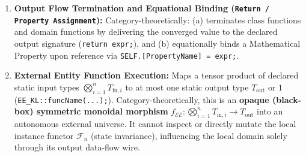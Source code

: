 \documentclass[11pt,a4paper]{article}
\theoremstyle{definition}
\theoremstyle{plain}
\theoremstyle{remark}
\begin{document}
\begin{enumerate}[label=\textbf{(\arabic*)}, leftmargin=*]
    \item \textbf{Output Flow Termination and Equational Binding (\texttt{Return / Property Assignment}):}
    Category-theoretically: (a) terminates class functions and domain functions by delivering the converged value to the declared output signature (\texttt{return expr;}), and (b) equationally binds a Mathematical Property upon reference via \texttt{SELF.[PropertyName] = expr;}.

    \item \textbf{External Entity Function Execution:}
    Maps a tensor product of declared static input types $\bigotimes_{i=1}^n T_{\mathrm{in}, i}$ to at most one static output type $T_{\mathrm{out}}$ or $1$ (\texttt{EE\_KL::funcName(...);}).
    Category-theoretically, this is an \textbf{opaque (black-box) symmetric monoidal morphism} $f_{\mathcal{EE}} : \bigotimes_{i=1}^n T_{\mathrm{in}, i} \to T_{\mathrm{out}}$ into an autonomous external universe. It cannot inspect or directly mutate the local instance functor $\mathcal{F}_n$ (state invariance), influencing the local domain solely through its output data-flow wire.
\end{enumerate}

\end{document}
